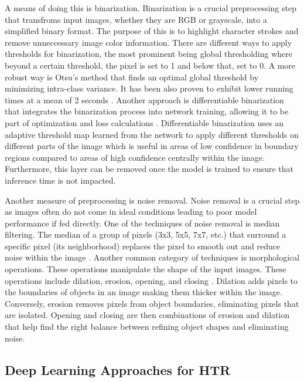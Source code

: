 \documentclass[conference]{IEEEtran}
\newcounter{customsubsubsection} %
\let\oldsubsection\subsection
\renewcommand{\subsection}[1]{%
  \oldsubsection{#1}%
  \setcounter{customsubsubsection}{0}%
}
\begin{document}
A means of doing this is binarization. Binarization is a crucial preprocessing step that transfroms input images, whether they are RGB or grayscale, into a simplified binary format. The purpose of this is to highlight character strokes and remove unneccessary image color information. There are different ways to apply thresholds for binarization, the most prominent being global thresholding where beyond a certain threshold, the pixel is set to 1 and below that, set to 0. A more robust way is Otsu's method \cite{otsu1979aa} that finds an optimal global threshold by minimizing intra-class variance. It has been also proven to exhibit lower running times at a mean of 2 seconds \cite{sahlol2014proposed}. Another approach is differentiable binarization that integrates the binarization process into network training, allowing it to be part of optimization and loss calculations \cite{liao2022real}. Differentiable binarization uses an adaptive threshold map learned from the network to apply different thresholds on different parts of the image which is useful in areas of low confidence in boundary regions compared to areas of high confidence centrally within the image. Furthermore, this layer can be removed once the model is trained to ensure that inference time is not impacted.  

Another measure of preprocessing is noise removal. Noise removal is a crucial step as images often do not come in ideal conditions leading to poor model performance if fed directly. One of the techniques of noise removal is median filtering. The median of a group of pixels (3x3, 5x5, 7x7, etc.) that surround a specific pixel (its neighborhood) replaces the pixel to smooth out and reduce noise within the image \cite{sahlol2014proposed,alghyaline2023arabic}. Another common category of techniques is morphological operations. These operations manipulate the shape of the input images. These operations include dilation, erosion, opening, and closing \cite{alghyaline2023arabic}. Dilation adds pixels to the boundaries of objects in an image making them thicker within the image. Conversely, erosion removes pixels from object boundaries, eliminating pixels that are isolated. Opening and closing are then combinations of erosion and dilation that help find the right balance between refining object shapes and eliminating noise. 




\subsection{Deep Learning Approaches for HTR}
\end{document}
